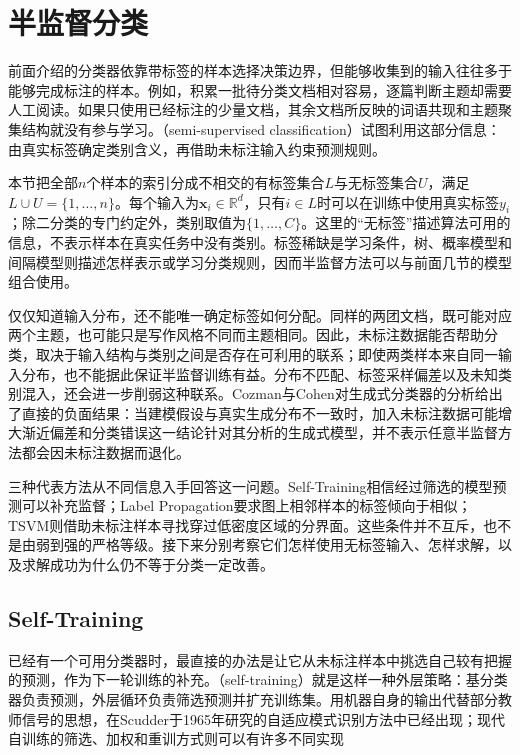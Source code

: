 \section{半监督分类}
\label{sec:classification-semisupervised}

前面介绍的分类器依靠带标签的样本选择决策边界，但能够收集到的输入往往多于能够完成标注的样本。例如，积累一批待分类文档相对容易，逐篇判断主题却需要人工阅读。如果只使用已经标注的少量文档，其余文档所反映的词语共现和主题聚集结构就没有参与学习。（semi-supervised classification）试图利用这部分信息：由真实标签确定类别含义，再借助未标注输入约束预测规则。

本节把全部$n$个样本的索引分成不相交的有标签集合$L$与无标签集合$U$，满足$L\cup U=\{1,\dots,n\}$。每个输入为$\bm{x}_i\in\mathbb{R}^{d}$，只有$i\in L$时可以在训练中使用真实标签$y_i$；除二分类的专门约定外，类别取值为$\{1,\dots,C\}$。这里的“无标签”描述算法可用的信息，不表示样本在真实任务中没有类别。标签稀缺是学习条件，树、概率模型和间隔模型则描述怎样表示或学习分类规则，因而半监督方法可以与前面几节的模型组合使用。

仅仅知道输入分布，还不能唯一确定标签如何分配。同样的两团文档，既可能对应两个主题，也可能只是写作风格不同而主题相同。因此，未标注数据能否帮助分类，取决于输入结构与类别之间是否存在可利用的联系；即使两类样本来自同一输入分布，也不能据此保证半监督训练有益。分布不匹配、标签采样偏差以及未知类别混入，还会进一步削弱这种联系。Cozman与Cohen对生成式分类器的分析给出了直接的负面结果：当建模假设与真实生成分布不一致时，加入未标注数据可能增大渐近偏差和分类错误这一结论针对其分析的生成式模型，并不表示任意半监督方法都会因未标注数据而退化。

三种代表方法从不同信息入手回答这一问题。Self-Training相信经过筛选的模型预测可以补充监督；Label Propagation要求图上相邻样本的标签倾向于相似；TSVM则借助未标注样本寻找穿过低密度区域的分界面。这些条件并不互斥，也不是由弱到强的严格等级。接下来分别考察它们怎样使用无标签输入、怎样求解，以及求解成功为什么仍不等于分类一定改善。

\subsection{Self-Training}
\label{sec:classification-self-training}

已经有一个可用分类器时，最直接的办法是让它从未标注样本中挑选自己较有把握的预测，作为下一轮训练的补充。（self-training）就是这样一种外层策略：基分类器负责预测，外层循环负责筛选预测并扩充训练集。用机器自身的输出代替部分教师信号的思想，在Scudder于1965年研究的自适应模式识别方法中已经出现；现代自训练的筛选、加权和重训方式则可以有许多不同实现

